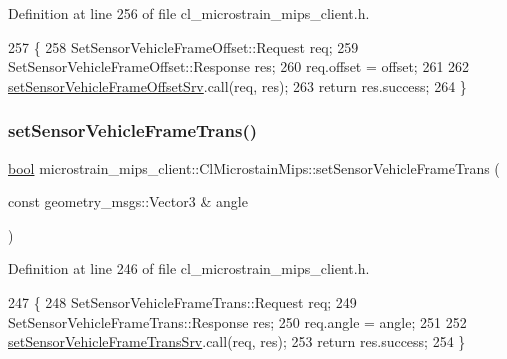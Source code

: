 Definition at line 256 of file cl\+\_\+microstrain\+\_\+mips\+\_\+client.\+h.


\begin{DoxyCode}
257     \{
258         SetSensorVehicleFrameOffset::Request req;
259         SetSensorVehicleFrameOffset::Response res;
260         req.offset = offset;
261 
262         \hyperlink{classmicrostrain__mips__client_1_1ClMicrostainMips_aa1d74713d0892154282f67b8a7724bdb}{setSensorVehicleFrameOffsetSrv}.call(req, res);
263         \textcolor{keywordflow}{return} res.success;
264     \}
\end{DoxyCode}
\mbox{\label{classmicrostrain__mips__client_1_1ClMicrostainMips_ac3d76fa8986d20e6b33ba4b556f09577}} 
\subsubsection{\texorpdfstring{set\+Sensor\+Vehicle\+Frame\+Trans()}{setSensorVehicleFrameTrans()}}
{\footnotesize\ttfamily \hyperlink{classbool}{bool} microstrain\+\_\+mips\+\_\+client\+::\+Cl\+Microstain\+Mips\+::set\+Sensor\+Vehicle\+Frame\+Trans (\begin{DoxyParamCaption}\item[{const geometry\+\_\+msgs\+::\+Vector3 \&}]{angle }\end{DoxyParamCaption})\hspace{0.3cm}{\ttfamily [inline]}}



Definition at line 246 of file cl\+\_\+microstrain\+\_\+mips\+\_\+client.\+h.


\begin{DoxyCode}
247     \{
248         SetSensorVehicleFrameTrans::Request req;
249         SetSensorVehicleFrameTrans::Response res;
250         req.angle = angle;
251 
252         \hyperlink{classmicrostrain__mips__client_1_1ClMicrostainMips_a255d0c9b27b2f55013186e5210aed3d7}{setSensorVehicleFrameTransSrv}.call(req, res);
253         \textcolor{keywordflow}{return} res.success;
254     \}
\end{DoxyCode}
\mbox{\label{classmicrostrain__mips__client_1_1ClMicrostainMips_a71aae9749e8dea394e8e7c571324db80}} 
